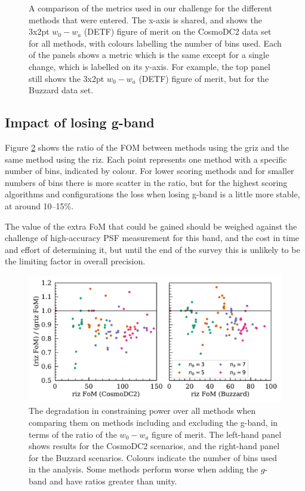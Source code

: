 \documentclass[twocolumn,twocolappendix]{aastex63}
\begin{document}
\begin{figure}[htbp]
\caption{A comparison of the metrics used in our challenge for the different methods that were entered. The x-axis is shared, and shows
the 3x2pt $w_0 - w_a$ (DETF) figure of merit on the CosmoDC2 data set for all methods, 
with colours labelling the number
of bins used.  Each of the panels shows a metric which is the same except for a single change, 
which is labelled on its y-axis.  For example, the top panel still shows the 3x2pt $w_0 - w_a$ (DETF) figure of merit,
but for the Buzzard data set.}
\label{fig:metrics}
\end{figure}



\subsection{Impact of losing g-band} \label{sec:gband}
Figure \ref{fig:loss} shows the ratio of the FOM between methods using the griz and the same method
using the riz.  Each point represents one method with a specific number of bins, indicated by colour.
For lower scoring methods and for smaller numbers of bins there is more scatter in the ratio,
but for the highest scoring algorithms and configurations the loss when losing g-band is a little
more stable, at around 10--15\%.

The value of the extra FoM that could be gained should be weighed against 
the challenge of high-accuracy
PSF measurement for this band, and the cost in time and effort of determining it, 
but until the end of the survey this is unlikely to be the limiting factor in overall precision.


\begin{figure}
\includegraphics[width=0.9\linewidth]{results/g_band_loss.pdf}
\caption{The degradation in constraining power over all methods
 when comparing them on methods including and excluding
the g-band, in terms of the ratio of the $w_0-w_a$ figure of merit.  The left-hand panel shows
results for the CosmoDC2 scenarios, and the right-hand panel for the Buzzard scenarios.  Colours
indicate the number of bins used in the analysis. Some methods perform worse when adding the $g$-band 
and have ratios greater than unity.}
\label{fig:loss}
\end{figure}
\end{document}
